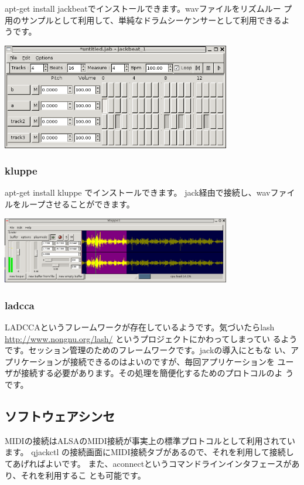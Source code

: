 \documentclass[mingoth,a4paper]{jsarticle}
\begin{document}
apt-get install jackbeatでインストールできます。wavファイルをリズムルー
プ用のサンプルとして利用して、単純なドラムシーケンサーとして利用できるよ
うです。

\includegraphics[width=10cm]{image200602/jackbeat.png}

\subsubsection{kluppe}

apt-get install kluppe でインストールできます。
jack経由で接続し、wavファイルをループさせることができます。

\includegraphics[width=10cm]{image200602/kluppe.png}

\subsubsection{ladcca}

LADCCAというフレームワークが存在しているようです。気づいたらlash
\url{http://www.nongnu.org/lash/} というプロジェクトにかわってしまってい
るようです。セッション管理のためのフレームワークです。jackの導入にともな
い、アプリケーションが接続できるのはよいのですが、毎回アプリケーションを
ユーザが接続する必要があります。その処理を簡便化するためのプロトコルのよ
うです。

\subsection{ソフトウェアシンセ}

MIDIの接続はALSAのMIDI接続が事実上の標準プロトコルとして利用されています。
qjackctl の接続画面にMIDI接続タブがあるので、それを利用して接続してあげればよいです。
また、aconnectというコマンドラインインタフェースがあり、それを利用するこ
とも可能です。
\end{document}
